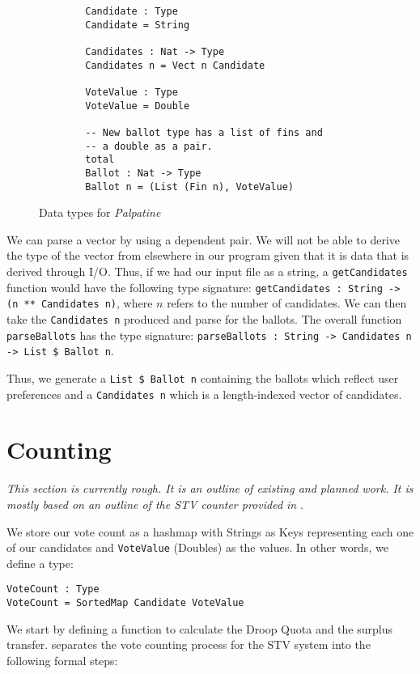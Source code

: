 \begin{figure}[ht!!!!!!]
    \caption{Data types for \textit{Palpatine}}
    \label{stv_data_types}
    \begin{lstlisting}
        Candidate : Type
        Candidate = String

        Candidates : Nat -> Type
        Candidates n = Vect n Candidate
        
        VoteValue : Type
        VoteValue = Double

        -- New ballot type has a list of fins and
        -- a double as a pair. 
        total
        Ballot : Nat -> Type
        Ballot n = (List (Fin n), VoteValue)
    \end{lstlisting}
\end{figure}

We can parse a vector by using a dependent pair. We will not be able to derive
the type of the vector from elsewhere in our program given that it is data that
is derived through I/O. Thus, if we had our input file as a string, a
\texttt{getCandidates} function would have the following type signature:
\texttt{getCandidates : String -> (n ** Candidates n)}, where $n$ refers to the
number of candidates. We can then take the \texttt{Candidates n} produced and
parse for the ballots. The overall function \texttt{parseBallots} has the type
signature: \texttt{parseBallots : String -> Candidates n -> List \$ Ballot n}.

Thus, we generate a \texttt{List \$ Ballot n} containing the ballots which
reflect user preferences and a \texttt{Candidates n} which is a length-indexed
vector of candidates. 

\section{Counting}

\textit{This section is currently rough. It is an outline of existing and
planned work. It is mostly based on an outline of the STV counter provided in}
\cite{stv_haskell}.


We store our vote count as a hashmap with Strings as Keys representing each one
of our candidates and \texttt{VoteValue} (Doubles) as the values. In other words, we define a type: 

\texttt{VoteCount : Type} \\
\texttt{VoteCount = SortedMap Candidate VoteValue}

We start by
defining a function to calculate the Droop Quota and the surplus transfer.
\cite{stv_haskell} separates the vote counting process for the STV system into
the following formal steps: 

